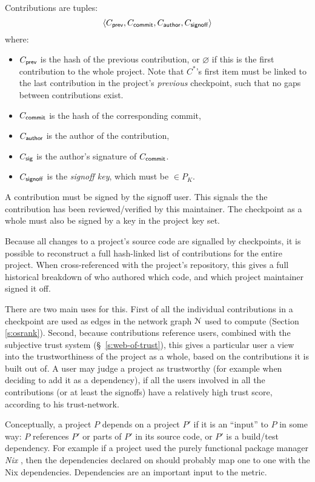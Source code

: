 Contributions are tuples:
\[
   \langle C_{\mathsf{prev}}, C_{\mathsf{commit}}, C_{\mathsf{author}}, C_{\mathsf{signoff}}\rangle
\]
where:
\begin{itemize}
\item $C_{\mathsf{prev}}$ is the hash of the previous contribution, or
  $\varnothing$ if this is the first contribution to the whole
  project. Note that $C^*$'s first item must be linked to the last
  contribution in the project's \emph{previous} checkpoint, such that no
  gaps between contributions exist.
\item $C_{\mathsf{commit}}$ is the hash of the corresponding commit,
\item $C_{\mathsf{author}}$ is the author of the contribution,
\item $C_{\mathsf{sig}}$ is the author's signature of $C_{\mathsf{commit}}$.
\item $C_{\mathsf{signoff}}$ is the \emph{signoff key}, which must be $\in P_K$.
\end{itemize}
A contribution must be signed by the signoff user. This signals the
the contribution has been reviewed/verified by this maintainer. The
checkpoint as a whole must also be signed by a key in the project key set.

Because all changes to a project's source code are signalled by
checkpoints, it is possible to reconstruct a full hash-linked list of
contributions for the entire project. When cross-referenced with the
project's repository, this gives a full historical breakdown of who
authored which code, and which project maintainer signed it off.

There are two main uses for this. First of all the individual
contributions in a checkpoint are used as edges in the network graph
$\mathcal{N}$ used to compute \osrank{} (Section \ref{s:osrank}).
Second, because contributions reference users, combined with the
subjective trust system (\S~\ref{s:web-of-trust}), this gives a
particular user a view into the trustworthiness of the project as a
whole, based on the contributions it is built out of. A user may judge
a project as trustworthy (for example when deciding to add it as a
dependency), if all the users involved in all the contributions (or at
least the signoffs) have a relatively high trust score, according to
his trust-network.

\label{s:dependencies}
Conceptually, a project $P$ depends on a project $P'$ if it is an
``input'' to $P$ in some way: $P$ references $P'$ or parts of
$P'$ in its source code, or $P'$ is a build/test dependency.
For example if a project used the purely functional package
manager \emph{Nix} \cite{nix}, then the dependencies declared on
\oscoin{} should probably map one to one with the Nix
dependencies. Dependencies are an important input to the \osrank{}
metric.

